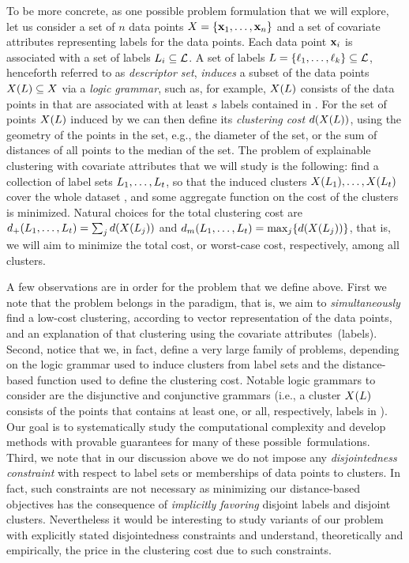 \documentclass[a4paper,11pt]{article}
\begin{document}
To be more concrete, as one possible problem formulation that we will explore, 
let us consider a set of $n$ data points $X=\{\mathbf{x}_1,\ldots,\mathbf{x}_n\}$
and a set of covariate attributes {} representing labels for the data points. 
Each data point $\mathbf{x}_i$ is associated with a set of labels ${L}_i\subseteq\mathcal{L}$. 
A set of labels ${L}=\{{\ell}_1,\ldots,{\ell}_k\}\subseteq\mathcal{L}$, 
henceforth referred to as \emph{descriptor set}, 
\emph{induces} a subset of the data points $X({L})\subseteq X$
via a \emph{logic grammar}, such as, for example, 
$X({L})$ consists of the data points in \dataset that 
are associated with at least $s$ labels contained in .
For the set of points $X({L})$ induced by  
we can then define its \emph{clustering cost} $d(X({L}))$, 
using the geometry of the points in the set, 
e.g., the diameter of the set, or the sum of distances of all points to the median of the set.
The problem of explainable clustering with covariate attributes that we will study is the following: 
find a collection of label sets ${L}_1,\ldots,{L}_t$, 
so that the induced clusters $X({L}_1),\ldots,X({L}_t)$
cover the whole dataset \dataset, 
and some aggregate function on the cost of the clusters is minimized. 
Natural choices for the total clustering cost are
$d_{+}({L}_1,\ldots,{L}_t) = \sum_{j} d(X({L}_j))$ and 
$d_{m}({L}_1,\ldots,{L}_t) = \max_{j}\! \left\{ d(X({L}_j)) \right\}$, 
that is, we will aim to minimize the total cost, or worst-case cost, respectively, 
among all clusters. 

A few observations are in order for the problem that we define above.
First we note that the problem belongs in the \joint paradigm, 
that is, we aim to \emph{simultaneously} find a low-cost clustering, 
according to vector representation of the data points,
and an explanation of that clustering using the covariate attributes~(labels).
%
Second, notice that we, in fact, define a very large family of problems, 
depending on the logic grammar used to induce clusters from label sets
and the distance-based function used to define the clustering cost.
Notable logic grammars to consider are the disjunctive and conjunctive grammars 
(i.e., a cluster $X({L})$ consists of the points 
that contains at least one, or all, respectively, labels in ).
Our goal is to systematically study the computational complexity and 
develop methods with provable guarantees
for many of these possible~formulations.
%
Third, we note that in our discussion above we do not impose any
\emph{disjointedness constraint} with respect to label sets or 
memberships of data points to clusters. 
In fact, such constraints are not necessary as minimizing 
our distance-based objectives has the consequence of \emph{implicitly favoring}
disjoint labels and disjoint clusters.
Nevertheless it would be interesting to study variants
of our problem with explicitly stated disjointedness constraints
and understand, theoretically and empirically, 
the price in the clustering cost due to such constraints.
\end{document}
